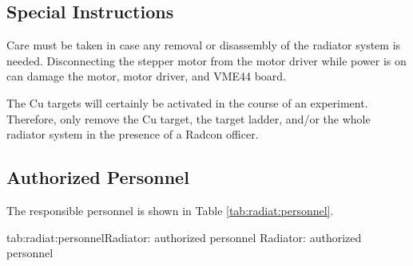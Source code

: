 {\begin{safetyen}{10}{10}
\subsection{Special Instructions}

Care must be taken in case any removal or disassembly of the radiator
system is needed.
Disconnecting the stepper motor from the motor driver
while power is on can damage the motor, motor driver, and VME44 board.

The Cu targets will certainly be activated in the course of an experiment.
Therefore, only remove the Cu target, the target ladder,
and/or the whole radiator system in the presence of a Radcon officer.
\end{safetyen}

} %

\begin{safetyen}{10}{15}
\subsection{ Authorized Personnel}
\end{safetyen}

The responsible personnel is shown in Table \ref{tab:radiat:personnel}.
\begin{namestab}{tab:radiat:personnel}{Radiator: authorized personnel}{%
   Radiator: authorized personnel}
\end{namestab}

